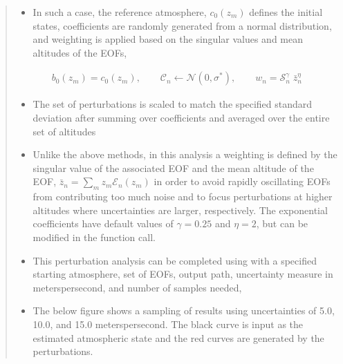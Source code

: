 \documentclass[letterpaper,10pt,english]{sphinxmanual}
\begin{document}
\begin{itemize}
\begin{quote}
\begin{itemize}
\item {} 
\sphinxAtStartPar
In such a case, the reference atmosphere, \(c_0 \left( z_m \right)\) defines the initial states, coefficients are randomly generated from a normal distribution, and weighting is applied based on the singular values and mean altitudes of the EOFs,

\end{itemize}
\begin{equation*}
\begin{split}b_0 \left( z_m \right) = c_0 \left( z_m \right), \quad \quad \mathcal{C}_n \longleftarrow \mathcal{N} \left(0, \sigma^* \right), \quad \quad w_n = \mathcal{S}_n^{\gamma} \; \bar{z}_n^{\eta}\end{split}
\end{equation*}\begin{itemize}
\item {} 
\sphinxAtStartPar
The set of perturbations is scaled to match the specified standard deviation after summing over coefficients and averaged over the entire set of altitudes

\item {} 
\sphinxAtStartPar
Unlike the above methods, in this analysis a weighting is defined by the singular value of the associated EOF and the mean altitude of the EOF, \(\bar{z}_n = \sum_m{z_m \mathcal{E}_n \left( z_m \right)}\) in order to avoid rapidly oscillating EOFs from contributing too much noise and to focus perturbations at higher altitudes where uncertainties are larger, respectively.  The exponential coefficients have default values of \(\gamma = 0.25\) and \(\eta=2\), but can be modified in the function call.

\item {} 
\sphinxAtStartPar
This perturbation analysis can be completed using  with a specified starting atmosphere, set of EOFs, output path, uncertainty measure in meters\sphinxhyphen{}per\sphinxhyphen{}second, and number of samples needed,

\end{itemize}

\begin{sphinxVerbatim}[commandchars=\\\{\}]
    
\end{sphinxVerbatim}
\begin{itemize}
\item {} 
\sphinxAtStartPar
The below figure shows a sampling of results using uncertainties of 5.0, 10.0, and 15.0 meters\sphinxhyphen{}per\sphinxhyphen{}second.  The black curve is input as the estimated atmospheric state and the red curves are generated by the perturbations.


\end{itemize}
\end{quote}
\end{itemize}
\end{document}
